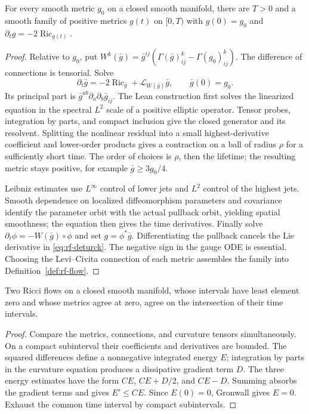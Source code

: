 \begin{lemma}\label{lem:rf-short-time-family}
For every smooth metric $g_0$ on a closed smooth manifold, there are
$T>0$ and a smooth family of positive metrics $g(t)$ on $[0,T)$ with
$g(0)=g_0$ and $\partial_tg=-2\operatorname{Ric}_{g(t)}$.
\end{lemma}
\begin{proof}
Relative to $g_0$, put
$W^k(\bar g)=\bar g^{ij}(\Gamma(\bar g)^k_{ij}-\Gamma(g_0)^k_{ij})$.
The difference of connections is tensorial. Solve
\begin{equation}\label{eq:rf-deturck}
 \partial_t\bar g=-2\operatorname{Ric}_{\bar g}
                 +\mathcal L_{W(\bar g)}\bar g,\qquad \bar g(0)=g_0 .
\end{equation}
Its principal part is $\bar g^{ab}\partial_a\partial_b\bar g_{ij}$.
The Lean construction first solves the linearized equation in the
spectral $L^2$ scale of a positive elliptic operator. Tensor probes,
integration by parts, and compact inclusion give the closed generator
and its resolvent. Splitting the nonlinear residual into a small
highest-derivative coefficient and lower-order products gives a
contraction on a ball of radius $\rho$ for a sufficiently short time.
The order of choices is $\rho$, then the lifetime; the resulting metric
stays positive, for example $\bar g\geq 3g_0/4$.

Leibniz estimates use $L^\infty$ control of lower jets and $L^2$ control
of the highest jets. Smooth dependence on localized diffeomorphism
parameters and covariance identify the parameter orbit with the actual
pullback orbit, yielding spatial smoothness; the equation then gives
the time derivatives. Finally solve
$\partial_t\phi=-W(\bar g)\circ\phi$ and set $g=\phi^*\bar g$.
Differentiating the pullback cancels the Lie derivative in
\eqref{eq:rf-deturck}. The negative sign in the gauge ODE is essential.
Choosing the Levi--Civita connection of each metric assembles the
family into Definition~\ref{def:rf-flow}.
\end{proof}

\begin{lemma}\label{lem:rf-uniqueness}
Two Ricci flows on a closed smooth manifold, whose intervals have
least element zero and whose metrics agree at zero, agree on the
intersection of their time intervals.
\end{lemma}
\begin{proof}
Compare the metrics, connections, and curvature tensors simultaneously.
On a compact subinterval their coefficients and derivatives are bounded.
The squared differences define a nonnegative integrated energy $E$;
integration by parts in the curvature equation produces a dissipative
gradient term $D$. The three energy estimates have the form
$CE$, $CE+D/2$, and $CE-D$. Summing absorbs the gradient terms and
gives $E'\leq CE$. Since $E(0)=0$, Gronwall gives $E=0$.
Exhaust the common time interval by compact subintervals.
\end{proof}

